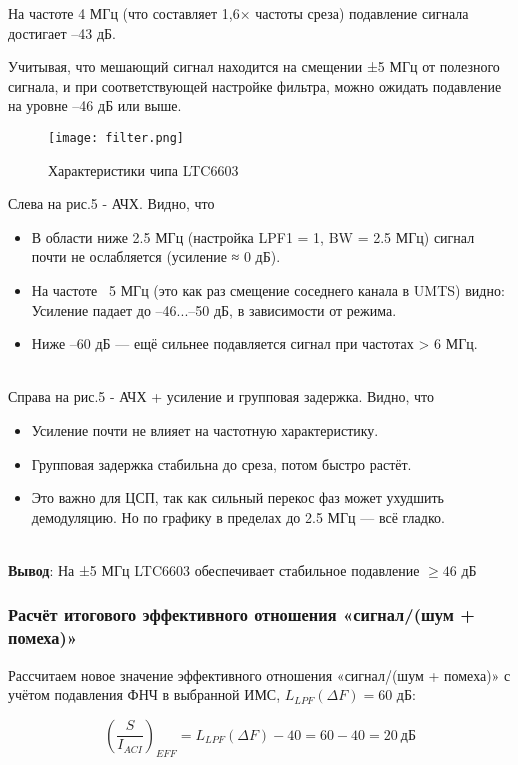 \documentclass[a4paper,12pt]{article}
\begin{document}
На частоте 4 МГц (что составляет 1,6× частоты среза) подавление сигнала достигает –43 дБ.​

Учитывая, что мешающий сигнал находится на смещении ±5 МГц от полезного сигнала, и при соответствующей настройке фильтра, можно ожидать подавление на уровне –46 дБ или выше.



\begin{figure}[H]
    \centering
    \texttt{[image: filter.png]}
    \caption{Характеристики чипа LTC6603}
    \label{fig:enter-label}
\end{figure}

Слева на рис.5 - АЧХ. Видно, что 
\begin{itemize}
\item В области ниже 2.5 МГц (настройка LPF1 = 1, BW = 2.5 МГц) сигнал почти не ослабляется (усиление ≈ 0 дБ).
\item На частоте ~5 МГц (это как раз смещение соседнего канала в UMTS) видно:
Усиление падает до –46...–50 дБ, в зависимости от режима.
\item Ниже –60 дБ — ещё сильнее подавляется сигнал при частотах > 6 МГц.
\end{itemize}

\\
Справа на рис.5 - АЧХ + усиление и групповая задержка. Видно, что 
\begin{itemize}
\item Усиление почти не влияет на частотную характеристику.
\item Групповая задержка стабильна до среза, потом быстро растёт.
\item Это важно для ЦСП, так как сильный перекос фаз может ухудшить демодуляцию. Но по графику в пределах до 2.5 МГц — всё гладко.
\end{itemize}
\\
\textbf{Вывод}: На ±5 МГц LTC6603 обеспечивает стабильное подавление $≥ 46$ дБ\\


\subsubsection{Расчёт итогового эффективного отношения «сигнал/(шум + помеха)»}

Рассчитаем новое значение эффективного отношения «сигнал/(шум + помеха)» с учётом подавления ФНЧ в выбранной ИМС, $L_{LPF}(\Delta F) = 60$ дБ:

\begin{equation}
\left( \frac{S}{I_{ACI}} \right)_{EFF} = L_{LPF}(\Delta F) - 40 = 60 - 40 = 20\ \text{дБ}
\end{equation}
\end{document}
